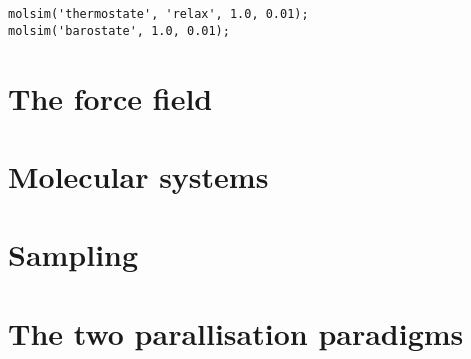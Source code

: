 \documentclass[11pt]{article}
\begin{document}
\begin{verbatim}
molsim('thermostate', 'relax', 1.0, 0.01);
molsim('barostate', 1.0, 0.01);
\end{verbatim}

\section{The force field}
\section{Molecular systems}
\section{Sampling}
\section{The two parallisation paradigms}
\end{document}
